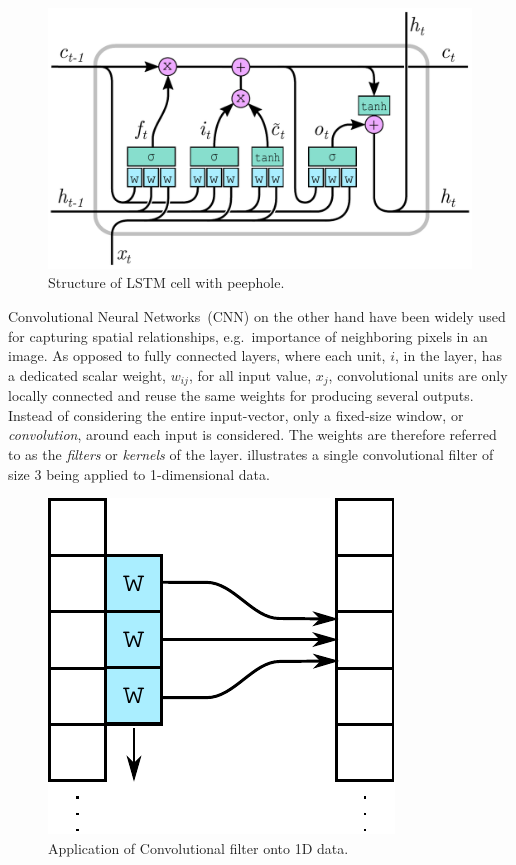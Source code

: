 \documentclass[preprint,11pt,5p,twocolumn]{elsarticle}
\begin{document}
\begin{figure}[!ht]
  \centering
  \includegraphics[scale=.45]{drawings/lstm-peepholes.pdf}
  \caption{Structure of LSTM cell with peephole.}
  \label{fig:lstm-peepholes}
\end{figure}

Convolutional Neural Networks~(CNN) on the other hand have been widely used for capturing spatial relationships, e.g.\ importance of neighboring pixels in an image. As opposed to fully connected layers, where each unit, $i$, in the layer, has a dedicated scalar weight, $w_{ij}$, for all input value, $x_j$, convolutional units are only locally connected and reuse the same weights for producing several outputs. Instead of considering the entire input-vector, only a fixed-size window, or \emph{convolution}, around each input is considered. The weights are therefore referred to as the \emph{filters} or \emph{kernels} of the layer.  illustrates a single convolutional filter of size $3$ being applied to 1-dimensional data.

\begin{figure}[!ht]
  \centering
  \includegraphics[scale=.45]{drawings/conv.pdf}
  \caption{Application of Convolutional filter onto 1D data.}
  \label{fig:conv}
\end{figure}
\end{document}
